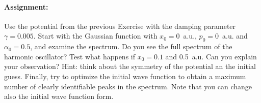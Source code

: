 \paragraph{Assignment:} Use the potential from the previous Exercise with the damping parameter $\gamma = 0.005$. Start with the Gaussian function with $x_0=0$~a.u., $p_0=0$~a.u. and $\alpha_0 = 0.5$, and examine the spectrum. Do you see the full spectrum of the harmonic oscillator? Test what happens if $x_0=0.1$ and 0.5~a.u. Can you explain your observation? Hint: think about the symmetry of the potential an the initial guess. Finally, try to optimize the initial wave function to obtain a maximum number of clearly identifiable peaks in the spectrum. Note that you can change also the initial wave function form.










